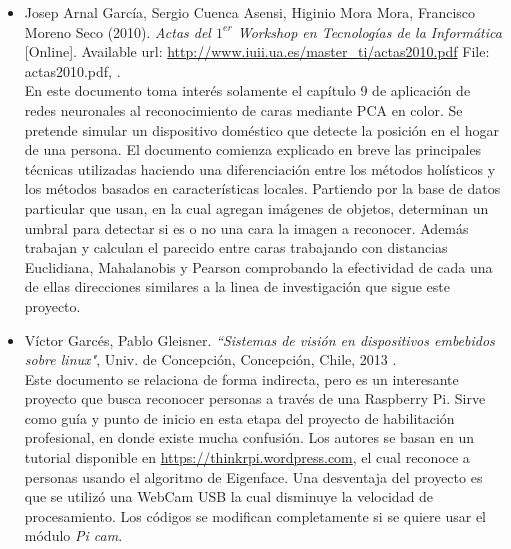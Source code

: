 \documentclass[letterpaper,12pt]{article}
\begin{document}
\begin{itemize}
\item Josep Arnal García, Sergio Cuenca Asensi, Higinio Mora Mora, Francisco Moreno Seco (2010). \textit{Actas del $1^{er}$ Workshop en Tecnologías de la Informática} [Online].
Available url: \url{http://www.iuii.ua.es/master_ti/actas2010.pdf}
File: actas2010.pdf, \cite{ActasTdeI}.\\

En este documento toma interés solamente el capítulo 9 de aplicación de redes neuronales al reconocimiento de caras mediante PCA en color. Se pretende simular un dispositivo doméstico que detecte la posición en el hogar de una persona. El documento comienza explicado en breve las principales técnicas utilizadas haciendo una diferenciación entre los métodos holísticos y los métodos basados en características locales. Partiendo por la base de datos particular que usan, en la cual agregan imágenes de objetos, determinan un umbral para detectar si es o no una cara la imagen a reconocer. Además trabajan y calculan el parecido entre caras trabajando con distancias Euclidiana, Mahalanobis y Pearson comprobando la efectividad de cada una de ellas direcciones similares a la linea de investigación que sigue este proyecto. 


\item Víctor Garcés, Pablo Gleisner. \textit{``Sistemas de visión en dispositivos embebidos sobre linux"}, Univ. de Concepción, Concepción, Chile, 2013 \cite{TrabajoRaspiUdeC}.\\

Este documento se relaciona de forma indirecta, pero es un interesante proyecto que busca reconocer personas a través de una Raspberry Pi. Sirve como guía y punto de inicio en esta etapa del proyecto de habilitación profesional, en donde existe mucha confusión. Los autores se basan en un tutorial disponible en \url{https://thinkrpi.wordpress.com}, el cual reconoce a personas usando el algoritmo de Eigenface. Una desventaja del proyecto es que se utilizó una WebCam USB la cual disminuye la velocidad de procesamiento. Los códigos se modifican completamente si se quiere usar el módulo \textit{Pi cam}. 

\end{itemize}
\end{document}
